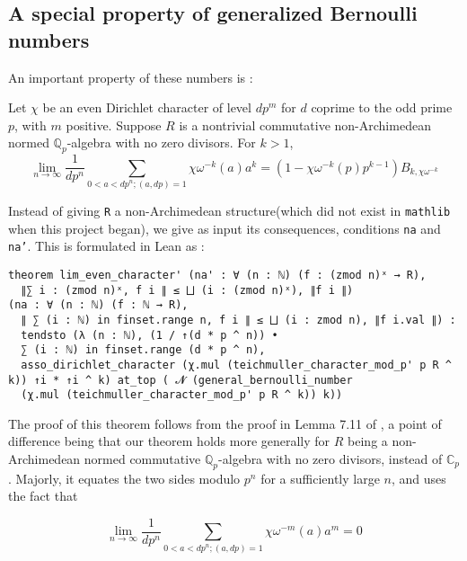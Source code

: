 \documentclass[a4paper,UKenglish,cleveref, autoref, thm-restate,pdfa]{lipics-v2021}
\newcommand{\lean}[1]{\texttt{#1}\xspace} %
\begin{document}
\subsection{A special property of generalized Bernoulli numbers}
An important property of these numbers is : 
\begin{theorem}\label{thm1}
Let $\chi$ be an even Dirichlet character of level $dp^m$ for $d$ coprime to the odd prime $p$, with $m$ positive. 
Suppose $R$ is a nontrivial commutative non-Archimedean normed $\mathbb{Q}_p$-algebra with no zero divisors. 
For $k > 1$, 
$$ \lim_{n \to \infty} \frac{1}{dp^{n}} \sum_{0 < a < dp^{n} ; (a, dp) = 1} \chi \omega^{-k} (a) a^{k} = 
(1 - \chi \omega^{-k} (p) p^{k-1}) B_{k, \chi \omega^{-k}} $$
\end{theorem} 
Instead of giving \lean{R} a non-Archimedean structure(which did not exist in \lean{mathlib} when this project began), 
we give as input its consequences, conditions \lean{na} and \lean{na'}. This is formulated in Lean as :
\begin{lstlisting}
theorem lim_even_character' (na' : ∀ (n : ℕ) (f : (zmod n)ˣ → R), 
  ∥∑ i : (zmod n)ˣ, f i ∥ ≤ ⨆ (i : (zmod n)ˣ), ∥f i ∥)
(na : ∀ (n : ℕ) (f : ℕ → R), 
  ∥ ∑ (i : ℕ) in finset.range n, f i ∥ ≤ ⨆ (i : zmod n), ∥f i.val ∥) : 
  tendsto (λ (n : ℕ), (1 / ↑(d * p ^ n)) • 
  ∑ (i : ℕ) in finset.range (d * p ^ n),
  asso_dirichlet_character (χ.mul (teichmuller_character_mod_p' p R ^ k)) ↑i * ↑i ^ k) at_top ( 𝓝 (general_bernoulli_number 
  (χ.mul (teichmuller_character_mod_p' p R ^ k)) k))
\end{lstlisting}
The proof of this theorem follows from the proof in Lemma 7.11 of \cite{cyc}, a 
point of difference being that our theorem holds more generally for $R$ being a non-Archimedean normed commutative $\mathbb{Q}_p$-algebra with no zero divisors, 
instead of $\mathbb{C}_p$. Majorly, it equates the two sides modulo $p^n$ for a 
sufficiently large $n$, and uses the fact that 
\begin{theorem}\label{thm2}
  $$ \lim_{n \to \infty} \frac{1}{dp^{n}} \sum_{0 < a < dp^{n} ; (a, dp) = 1} \chi \omega^{-m} (a) a^{m} = 0 $$
\end{theorem}
\end{document}
